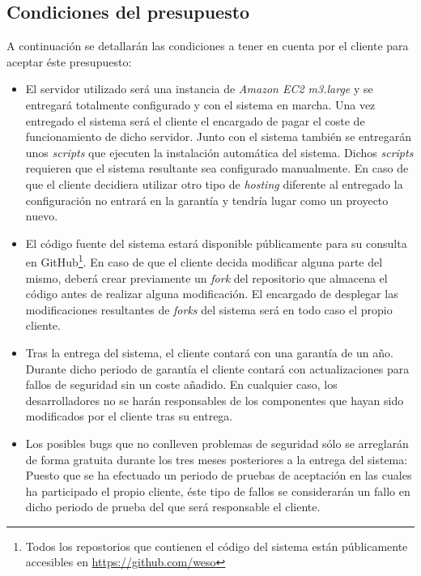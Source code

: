 \subsection{Condiciones del presupuesto}
A continuación se detallarán las condiciones a tener en cuenta por el cliente para aceptar éste presupuesto:
\begin{itemize}
	\item El servidor utilizado será una instancia de \textit{Amazon EC2 m3.large} y se entregará totalmente configurado y con el sistema en marcha.  Una vez entregado el sistema será el cliente el encargado de pagar el coste de funcionamiento de dicho servidor.  Junto con el sistema también se entregarán unos \textit{scripts} que ejecuten la instalación automática del sistema.  Dichos \textit{scripts} requieren que el sistema resultante sea configurado manualmente.  En caso de que el cliente decidiera utilizar otro tipo de \textit{hosting} diferente al entregado la configuración no entrará en la garantía y tendría lugar como un proyecto nuevo.
	
	\item El código fuente del sistema estará disponible públicamente para su consulta en GitHub\footnote{Todos los repostorios que contienen el código del sistema están públicamente accesibles en \url{https://github.com/weso}}.  En caso de que el cliente decida modificar alguna parte del mismo, deberá crear previamente un \textit{fork} del repositorio que almacena el código antes de realizar alguna modificación.  El encargado de desplegar las modificaciones resultantes de \textit{forks} del sistema será en todo caso el propio cliente.
	
	\item Tras la entrega del sistema, el cliente contará con una garantía de un año.  Durante dicho periodo de garantía el cliente contará con actualizaciones para fallos de seguridad sin un coste añadido.  En cualquier caso, los desarrolladores no se harán responsables de los componentes que hayan sido modificados por el cliente tras su entrega.
	
	\item Los posibles bugs que no conlleven problemas de seguridad sólo se arreglarán de forma gratuita durante los tres meses posteriores a la entrega del sistema: Puesto que se ha efectuado un periodo de pruebas de aceptación en las cuales ha participado el propio cliente, éste tipo de fallos se considerarán un fallo en dicho periodo de prueba del que será responsable el cliente.
\end{itemize}